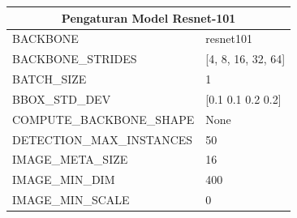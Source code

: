 \begin{longtable}[h]{|l|l|}
	\hline
	\multicolumn{2}{|c|}{\textbf{Pengaturan Model Resnet-101}}                                                                                                                                                                         \\ \hline
	BACKBONE                        & resnet101                                                                                                                                                                              \\ \hline
	BACKBONE\_STRIDES               & {[}4, 8, 16, 32, 64{]}                                                                                                                                                                 \\ \hline
	BATCH\_SIZE                     & 1                                                                                                                                                                                      \\ \hline
	BBOX\_STD\_DEV                  & {[}0.1 0.1 0.2 0.2{]}                                                                                                                                                                  \\ \hline
	COMPUTE\_BACKBONE\_SHAPE        & None                                                                                                                                                                                   \\ \hline
	DETECTION\_MAX\_INSTANCES       &	 50                                                    	\\ \hline
	IMAGE\_META\_SIZE               & 16                                                                                                                                                                                     \\ \hline
	IMAGE\_MIN\_DIM                 & 400                                                                                                                                                                                    \\ \hline
	IMAGE\_MIN\_SCALE               & 0                                                                                                                                                                                      \\ \hline

\end{longtable}
